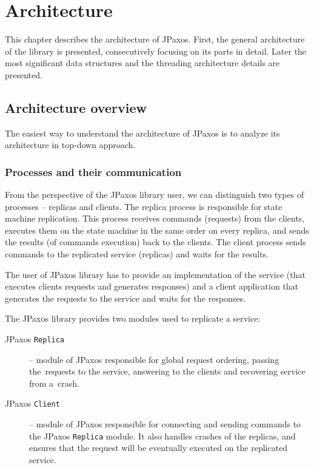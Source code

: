 \chapter{Architecture}

This chapter describes the architecture of JPaxos.
First, the general architecture of the library is presented, consecutively focusing on its parts in detail.
Later the most significant data structures and the threading architecture details are presented.

\section{Architecture overview}
\indent\par
The easiest way to understand the architecture of JPaxos is to analyze its architecture in top-down approach.

\subsection{Processes and their communication}

From the perspective of the JPaxos library user, we can distinguish two types of processes -- replicas and clients. The replica process is responsible for state machine replication. This process receives commands (requests) from the clients, executes them on the state machine in the same order on every replica, and sends the results (of commands execution) back to the clients. The client process sends commands to the replicated service (replicas) and waits for the results.

The user of JPaxos library has to provide an implementation of the service (that executes clients requests and generates responses) and a client application that generates the requests to the service and waits for the responses.

The JPaxos library provides two modules used to replicate a service:
\begin{description}
  \item[JPaxos \texttt{Replica}] -- module of JPaxos responsible for global request ordering, passing the~requests to the service, answering to the clients and recovering service from a~crash.
  \item[JPaxos \texttt{Client}] -- module of JPaxos responsible for connecting and sending commands to the JPaxos \texttt{Replica} module. It also handles crashes of the replicas, and ensures that the request will be eventually executed on the replicated service.
\end{description}

